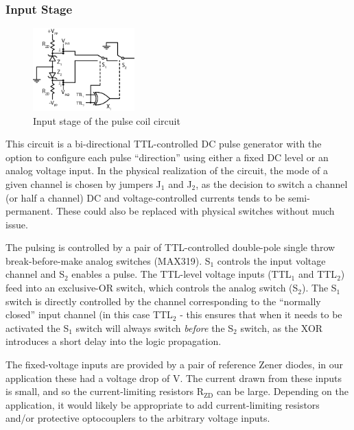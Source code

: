 \documentclass[PaulGanssle-Thesis.tex]{subfiles}
\begin{document}
\subsubsection{Input Stage}
\label{pulse.circuit.input}
\begin{figure}
\vspace*{-0.5\lineheight}
\includegraphics[width=0.35\textwidth]{figures/magnetometer/PulseCoilCircuitInputStage.eps}
\caption{Input stage of the pulse coil circuit}
\label{fig:pulse.circuit.inputstage}
\vspace*{-1.5\lineheight}
\end{figure}This circuit is a bi-directional TTL-controlled DC pulse generator with the option to configure each pulse ``direction'' using either a fixed DC level or an analog voltage input. In the physical realization of the circuit, the mode of a given channel is chosen by jumpers J$_1$ and J$_2$, as the decision to switch a channel (or half a channel) DC and voltage-controlled currents tends to be semi-permanent. These could also be replaced with physical switches without much issue.

The pulsing is controlled by a pair of TTL-controlled double-pole single throw break-before-make analog switches (MAX319). S$_1$ controls the input voltage channel and S$_2$ enables a pulse. The TTL-level voltage inputs (TTL$_1$ and TTL$_2$) feed into an exclusive-OR switch, which controls the analog switch (S$_2$). The S$_1$ switch is directly controlled by the channel corresponding to the ``normally closed'' input channel (in this case TTL$_2$ - this ensures that when it needs to be activated the S$_1$ switch will always switch \emph{before} the S$_2$ switch, as the XOR introduces a short delay into the logic propagation.

The fixed-voltage inputs are provided by a pair of reference Zener diodes, in our application these had a voltage drop of \unit[5]{V}. The current drawn from these inputs is small, and so the current-limiting resistors $\mathrm{R}_{\mathrm{ZD}}$ can be large. Depending on the application, it would likely be appropriate to add current-limiting resistors and/or protective optocouplers to the arbitrary voltage inputs.
\end{document}
